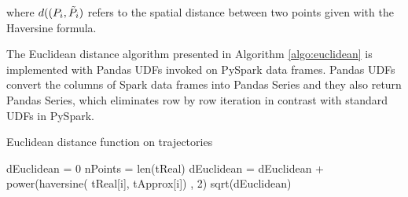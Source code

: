 where $d((P_{i},\Tilde{P_{i}})$ refers to the spatial distance between two points given with the Haversine formula.

The Euclidean distance algorithm presented in Algorithm \ref{algo:euclidean} is implemented with Pandas UDFs invoked on PySpark data frames. Pandas UDFs convert the columns of Spark data frames into Pandas Series and they also return Pandas Series, which eliminates row by row iteration in contrast with standard UDFs in PySpark.

\begin{algorithm}
\begin{algorithmic}
\caption{Euclidean distance function on trajectories} \label{algo:euclidean}
\State dEuclidean = 0
\State nPoints = len(tReal) 
    \State dEuclidean = dEuclidean + power(haversine(     
    \State tReal[i], tApprox[i]) , 2)
\EndFor
\Return sqrt(dEuclidean)
\EndFunction
\end{algorithmic}
\end{algorithm}


